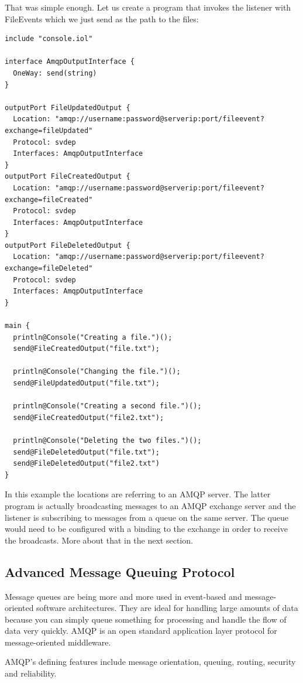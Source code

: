 That was simple enough. Let us create a program that invokes the listener with FileEvents which we just send as the path to the files:

\begin{lstlisting}
include "console.iol"

interface AmqpOutputInterface {
  OneWay: send(string)
}

outputPort FileUpdatedOutput {
  Location: "amqp://username:password@serverip:port/fileevent?exchange=fileUpdated"
  Protocol: svdep
  Interfaces: AmqpOutputInterface
}
outputPort FileCreatedOutput {
  Location: "amqp://username:password@serverip:port/fileevent?exchange=fileCreated"
  Protocol: svdep
  Interfaces: AmqpOutputInterface
}
outputPort FileDeletedOutput {
  Location: "amqp://username:password@serverip:port/fileevent?exchange=fileDeleted"
  Protocol: svdep
  Interfaces: AmqpOutputInterface
}

main {
  println@Console("Creating a file.")();
  send@FileCreatedOutput("file.txt");

  println@Console("Changing the file.")();
  send@FileUpdatedOutput("file.txt");

  println@Console("Creating a second file.")();
  send@FileCreatedOutput("file2.txt");

  println@Console("Deleting the two files.")();
  send@FileDeletedOutput("file.txt");
  send@FileDeletedOutput("file2.txt")
}
\end{lstlisting}

In this example the locations are referring to an AMQP server. The latter program is actually broadcasting messages to an AMQP exchange server and the listener is subscribing to messages from a queue on the same server. The queue would need to be configured with a binding to the exchange in order to receive the broadcasts. More about that in the next section.
\subsection{Advanced Message Queuing Protocol}
Message queues are being more and more used in event-based and message-oriented software architectures. They are ideal for handling large amounts of data because you can simply queue something for processing and handle the flow of data very quickly. AMQP\cite{AMQP} is an open standard application layer protocol for message-oriented middleware.

AMQP's defining features include message orientation, queuing, routing, security and reliability.

